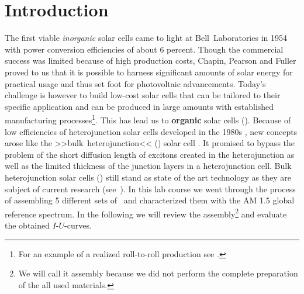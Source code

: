 
\section*{Introduction}%

The first viable \textit{inorganic} solar cells came to light at Bell~Laboratories in 1954 \cite{siliconSC_1}\cite{siliconSC_2} with power conversion efficiencies of about 6 percent. Though the commercial success was limited because of high production costs, Chapin, Pearson and Fuller proved to us that it is possible to harness significant amounts of solar energy for practical usage and thus set foot for photovoltaic advancements.\mypar
Today's challenge is however to build low-cost solar cells that can be tailored to their specific application and can be produced in large amounts with established manufacturing processes\footnote{For an example of a realized roll-to-roll production see \cite{rolltoroll}.}. This has lead us to \textbf{organic} solar cells (\OSC).\mypar
Because of low efficiencies of heterojunction solar cells developed in the 1980s \cite{tang}, new concepts arose like the >>bulk~heterojunction<< (\BHJ) solar cell \cite{heterojunk}. It promised to bypass the problem of the short diffusion length of excitons created in the heterojunction as well as the limited thickness of the junction layers in a heterojunction cell.\mypar
Bulk heterojunction solar cells (\BHSC) still stand as state of the art technology as they are subject of current research (see~\cite{modernbulkhetero}). In this lab course we went through the process of assembling 5 different sets of \BHSC\ and characterized them with the {\os\sefo AM 1.5} global reference spectrum. In the following we will review the assembly\footnote{We will call it assembly because we did not perform the complete preparation of the all used materials.} and evaluate the obtained $I$-$U$-curves.

